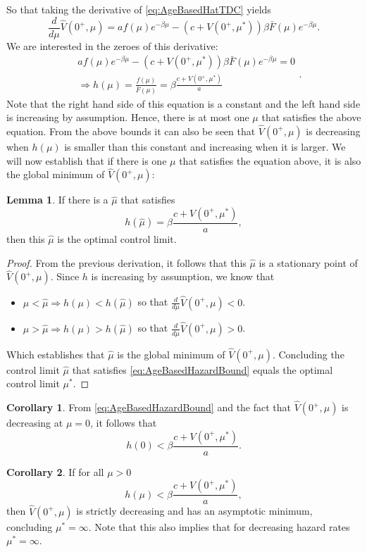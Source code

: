 \documentclass[a4paper]{thesis}
\theoremstyle{definition}
\newtheorem{corollary}{Corollary}[chapter]
\newtheorem{lemma}{Lemma}[chapter]
\begin{document}
So that taking the derivative of \eqref{eq:AgeBasedHatTDC} yields
\[\frac{d}{d\mu}\hat{V}(0^+,\mu)=af(\mu)e^{-\beta\mu}-(c+V(0^+,\mu^*))\beta\bar{F}(\mu)e^{-\beta\mu}.\]
We are interested in the zeroes of this derivative:
\[
\begin{split}
&af(\mu)e^{-\beta\mu}-(c+V(0^+,\mu^*))\beta\bar{F}(\mu)e^{-\beta\mu}=0\\
&\Rightarrow h(\mu)=\frac{f(\mu)}{\bar{F}(\mu)}=\beta\frac{c+V(0^+,\mu^*)}{a}
\end{split}
.\]
Note that the right hand side of this equation is a constant and the left hand side is increasing by assumption.
Hence, there is at most one $\mu$ that satisfies the above equation.
From the above bounds it can also be seen that $\hat{V}(0^+,\mu)$ is decreasing when $h(\mu)$ is smaller than this constant and increasing when it is larger.
We will now establish that if there is one $\mu$ that satisfies the equation above, it is also the global minimum of $\hat{V}(0^+,\mu)$:
\begin{lemma}\label{lemma:AgeBasedControlLimit}
	If there is a $\hat{\mu}$ that satisfies
	\begin{equation}\label{eq:AgeBasedHazardBound}
	h(\hat{\mu})=\beta\frac{c+V(0^+,\mu^*)}{a},
	\end{equation}
	then this $\hat{\mu}$ is the optimal control limit.
	\begin{proof}
		From the previous derivation, it follows that this $\hat{\mu}$ is a stationary point of $\hat{V}(0^+,\mu)$.
		Since $h$ is increasing by assumption, we know that
		\begin{itemize}
			\item $\mu<\hat{\mu}\Rightarrow h(\mu)<h(\hat{\mu})$ so that $\frac{d}{d\mu}\hat{V}(0^+,\mu)<0$.
			\item $\mu>\hat{\mu}\Rightarrow h(\mu)>h(\hat{\mu})$ so that $\frac{d}{d\mu}\hat{V}(0^+,\mu)>0$.
		\end{itemize}
		Which establishes that $\hat{\mu}$ is the global minimum of $\hat{V}(0^+,\mu)$.
		Concluding the control limit $\hat{\mu}$ that satisfies \eqref{eq:AgeBasedHazardBound} equals the optimal control limit $\mu^*$.
	\end{proof}
\end{lemma}
\begin{corollary}
	From \eqref{eq:AgeBasedHazardBound} and the fact that $\hat{V}(0^+,\mu)$ is decreasing at $\mu=0$, it follows that
	\[
	h(0)<\beta\frac{c+V(0^+,\mu^*)}{a}.
	\]
\end{corollary}
\begin{corollary}
If for all $\mu>0$
\[
h(\mu)<\beta\frac{c+V(0^+,\mu^*)}{a},
\]
then $\hat{V}(0^+,\mu)$ is strictly decreasing and has an asymptotic minimum, concluding $\mu^*=\infty$.
Note that this also implies that for decreasing hazard rates $\mu^*=\infty$.
\end{corollary}
\end{document}
